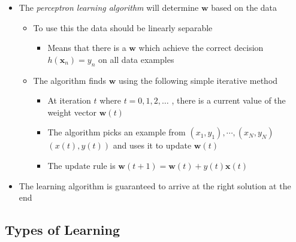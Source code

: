 \documentclass[11pt]{article}
\begin{document}
\begin{itemize}
\item The \emph{perceptron learning algorithm} will determine \(\pmb w\) based on the data
\begin{itemize}
\item To use this the data should be linearly separable
\begin{itemize}
\item Means that there is a \(\pmb w\) which achieve the correct decision \(h(\pmb x_n)=y_n\) on all data examples
\end{itemize}
\item The algorithm finds \(\pmb w\) using the following simple iterative method
\begin{itemize}
\item At iteration \(t\) where \(t = 0,1,2, \dots\) , there is a current value of the weight vector \(\pmb w(t)\)
\item The algorithm picks an example from \((x_1, y_1), \cdots, (x_N, y_N)\) \((x(t), y(t))\) and uses it to update \(\pmb w(t)\)
\item The update rule is  \(\pmb w(t+1) = \pmb w(t) + y(t)\pmb x(t)\)
\end{itemize}
\end{itemize}
\end{itemize}


\begin{itemize}
\item The learning algorithm is guaranteed to arrive at the right solution at the end
\end{itemize}

\subsection{Types of Learning}
\label{sec:orgd49b23c}
\end{document}
